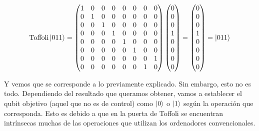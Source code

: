 \documentclass{article}
\numberwithin{equation}{section} %
\begin{document}
    \begin{equation*}
        \text{Toffoli} \ket{0 1 1} = \begin{pmatrix}
            1 & 0 & 0 & 0 & 0 & 0 & 0 & 0 \\
            0 & 1 & 0 & 0 & 0 & 0 & 0 & 0 \\
            0 & 0 & 1 & 0 & 0 & 0 & 0 & 0 \\
            0 & 0 & 0 & 1 & 0 & 0 & 0 & 0 \\
            0 & 0 & 0 & 0 & 1 & 0 & 0 & 0 \\
            0 & 0 & 0 & 0 & 0 & 1 & 0 & 0 \\
            0 & 0 & 0 & 0 & 0 & 0 & 0 & 1 \\
            0 & 0 & 0 & 0 & 0 & 0 & 1 & 0 
        \end{pmatrix} \begin{pmatrix}
            0 \\
            0 \\
            0 \\
            1 \\
            0 \\
            0 \\
            0 \\
            0
        \end{pmatrix} = \begin{pmatrix}
            0 \\
            0 \\
            0 \\
            1 \\
            0 \\
            0 \\
            0 \\
            0
        \end{pmatrix} = \ket{0 1 1}
    \end{equation*}

    \vspace{2.5mm}

    Y vemos que se corresponde a lo previamente explicado. Sin embargo, esto no es todo. Dependiendo del resultado que queramos obtener, vamos a establecer el qubit objetivo (aquel que no es de control) como \( \ket{0} \) o \( \ket{1} \) según la operación que corresponda. Esto es debido a que en la puerta de Toffoli se encuentran intrínsecas muchas de las operaciones que utilizan los ordenadores convencionales.
    
    \vspace{5mm}
\end{document}
